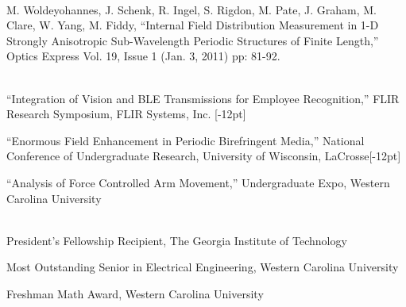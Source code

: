 \documentclass[14pt,letterpaper]{extarticle}
\begin{document}
\vspace{5.3pt}\\
\noindent
\footnotesize{M. Woldeyohannes, J. Schenk, R. Ingel, S. Rigdon, M. Pate, J. Graham, M. Clare, W. Yang, M. Fiddy, ``Internal Field Distribution Measurement in 1-D Strongly Anisotropic Sub-Wavelength Periodic Structures of Finite Length,'' Optics Express Vol. 19, Issue 1 (Jan. 3, 2011) pp: 81-92.}

\vspace{5.3pt}\\
\footnotesize{``Integration of Vision and BLE Transmissions for Employee Recognition,'' FLIR Research Symposium, FLIR Systems, Inc.}
[-12pt]

\medskip\noindent
\footnotesize{``Enormous  Field  Enhancement  in  Periodic  Birefringent Media,''
National Conference of Undergraduate Research, University of Wisconsin, LaCrosse}[-12pt]

\medskip\noindent
\footnotesize{``Analysis of Force Controlled Arm Movement,'' Undergraduate Expo, Western Carolina University}

\vspace{5.3pt}\\
\noindent\footnotesize{President's Fellowship Recipient, The Georgia Institute of Technology}

\medskip
\noindent\footnotesize{Most Outstanding Senior in Electrical Engineering, Western Carolina University}

\medskip
\noindent\footnotesize{Freshman Math Award, Western Carolina University}
\end{document}

